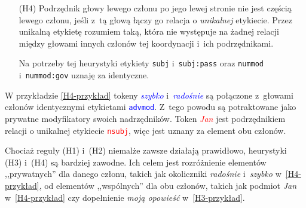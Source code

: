 \begin{enumerate}
\item[(H4)] Podrzędnik głowy lewego członu po jego lewej stronie nie jest częścią lewego członu, jeśli z~tą głową łączy go relacja o \emph{unikalnej} etykiecie. Przez unikalną etykietę rozumiem taką, która nie występuje na żadnej relacji między głowami innych członów tej koordynacji i~ich podrzędnikami. 

Na potrzeby tej heurystyki etykiety \texttt{subj} i~\texttt{subj:pass} oraz \texttt{nummod} i~\texttt{nummod:gov} uznaję za identyczne.
\end{enumerate}

W przykładzie \eqref{H4-przykład} tokeny \textcolor{blue}{\textit{szybko}} i~\textcolor{blue}{\textit{radośnie}} są połączone z~głowami członów identycznymi etykietami \textcolor{blue}{\texttt{advmod}}. Z~tego powodu są potraktowane jako prywatne modyfikatory swoich nadrzędników. Token \textcolor{red}{\textit{Jan}} jest podrzędnikiem relacji o unikalnej etykiecie \textcolor{red}{\texttt{nsubj}}, więc jest uznany za element obu członów.

\begin{exe}
\ex \label{H4-przykład}
\end{exe}

Chociaż reguły (H1) i~(H2) niemalże zawsze działają prawidłowo, heurystyki (H3) i~(H4) są bardziej zawodne. Ich celem jest rozróżnienie elementów ,,prywatnych'' dla danego członu, takich jak okoliczniki \emph{radośnie} i~\emph{szybko} w~\eqref{H4-przykład}, od elementów ,,wspólnych'' dla obu członów, takich jak podmiot \emph{Jan} w~\eqref{H4-przykład} czy dopełnienie \emph{moją opowieść} w~\eqref{H3-przykład}. 

